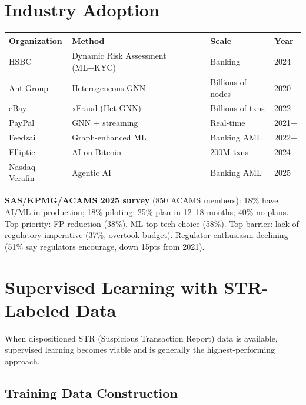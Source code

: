 \documentclass[11pt]{article}
\begin{document}
\section{Industry Adoption}

\begin{center}
\small
\begin{tabular}{llll}
\toprule
\textbf{Organization} & \textbf{Method} & \textbf{Scale} & \textbf{Year} \\
\midrule
HSBC & Dynamic Risk Assessment (ML+KYC) & Banking & 2024 \\
Ant Group & Heterogeneous GNN & Billions of nodes & 2020+ \\
eBay & xFraud (Het-GNN) & Billions of txns & 2022 \\
PayPal & GNN + streaming & Real-time & 2021+ \\
Feedzai & Graph-enhanced ML & Banking AML & 2022+ \\
Elliptic & AI on Bitcoin & 200M txns & 2024 \\
Nasdaq Verafin & Agentic AI & Banking AML & 2025 \\
\bottomrule
\end{tabular}
\end{center}

\textbf{SAS/KPMG/ACAMS 2025 survey} (850 ACAMS members): 18\% have AI/ML in production; 18\% piloting; 25\% plan in 12--18 months; 40\% no plans. Top priority: FP reduction (38\%). ML top tech choice (58\%). Top barrier: lack of regulatory imperative (37\%, overtook budget). Regulator enthusiasm declining (51\% say regulators encourage, down 15pts from 2021).

\section{Supervised Learning with STR-Labeled Data}

When dispositioned STR (Suspicious Transaction Report) data is available, supervised learning becomes viable and is generally the highest-performing approach.

\subsection{Training Data Construction}
\end{document}

